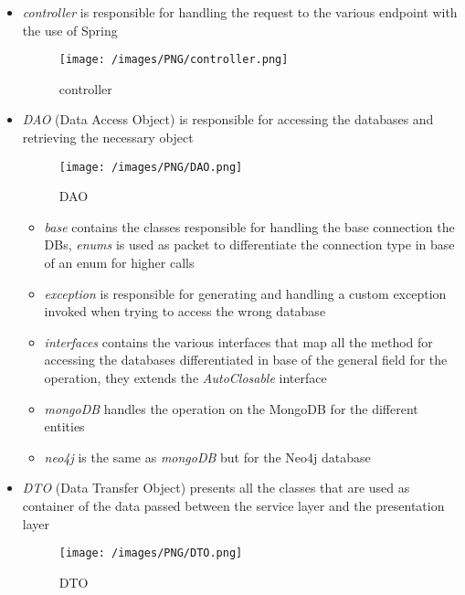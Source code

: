 \begin{itemize}
	\item \emph{controller} is responsible for handling the request to the various endpoint with the use of Spring
	\begin{figure}[H]
	\begin{center}
	\texttt{[image: /images/PNG/controller.png]}
	\caption{controller}
	\end{center}
	\end{figure}
	
	\item \emph{DAO} (Data Access Object) is responsible for accessing the databases and retrieving the necessary object
	\begin{figure}[H]
	\begin{center}
	\texttt{[image: /images/PNG/DAO.png]}
	\caption{DAO}
	\end{center}
	\end{figure}
	\begin{itemize}
		\item \emph{base} contains the classes responsible for handling the base connection the DBs, \emph{enums} is used as packet to differentiate the connection type in base of an enum for higher calls
	
		\item \emph{exception} is responsible for generating and handling a custom exception invoked when trying to access the wrong database
	
		\item \emph{interfaces} contains the various interfaces that map all the method for accessing the databases differentiated in base of the general field for the operation, they extends the \emph{AutoClosable} interface
		\item \emph{mongoDB} handles the operation on the MongoDB for the different entities
		\item \emph{neo4j} is the same as \emph{mongoDB} but for the Neo4j database
	
	\end{itemize}
	\item \emph{DTO} (Data Transfer Object) presents all the classes that are used as container of the data passed between the service layer and the presentation layer
	
	\begin{figure}[H]
	\begin{center}
	\texttt{[image: /images/PNG/DTO.png]}
	\caption{DTO}
	\end{center}
	\end{figure}
	
\end{itemize}

